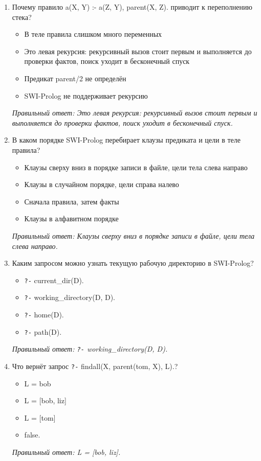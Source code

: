 \begin{enumerate}[label=\textbf{\arabic*.}, leftmargin=0pt, itemsep=1.2em]
\item Почему правило a(X, Y) :- a(Z, Y), parent(X, Z). приводит к переполнению стека?
\begin{itemize}[label=$\square$, leftmargin=1.5cm, itemsep=0.2em, topsep=0.3em]
\item В теле правила слишком много переменных
\item Это левая рекурсия: рекурсивный вызов стоит первым и выполняется до проверки фактов, поиск уходит в бесконечный спуск
\item Предикат parent/2 не определён
\item SWI-Prolog не поддерживает рекурсию
\end{itemize}
{\small\textit{Правильный ответ: Это левая рекурсия: рекурсивный вызов стоит первым и выполняется до проверки фактов, поиск уходит в бесконечный спуск.}}

\item В каком порядке SWI-Prolog перебирает клаузы предиката и цели в теле правила?
\begin{itemize}[label=$\square$, leftmargin=1.5cm, itemsep=0.2em, topsep=0.3em]
\item Клаузы сверху вниз в порядке записи в файле, цели тела слева направо
\item Клаузы в случайном порядке, цели справа налево
\item Сначала правила, затем факты
\item Клаузы в алфавитном порядке
\end{itemize}
{\small\textit{Правильный ответ: Клаузы сверху вниз в порядке записи в файле, цели тела слева направо.}}

\item Каким запросом можно узнать текущую рабочую директорию в SWI-Prolog?
\begin{itemize}[label=$\square$, leftmargin=1.5cm, itemsep=0.2em, topsep=0.3em]
\item \texttt{?-} current\_dir(D).
\item \texttt{?-} working\_directory(D, D).
\item \texttt{?-} home(D).
\item \texttt{?-} path(D).
\end{itemize}
{\small\textit{Правильный ответ: \texttt{?-} working\_directory(D, D).}}

\item Что вернёт запрос \texttt{?-} findall(X, parent(tom, X), L).?
\begin{itemize}[label=$\square$, leftmargin=1.5cm, itemsep=0.2em, topsep=0.3em]
\item L = bob
\item L = [bob, liz]
\item L = [tom]
\item false.
\end{itemize}
{\small\textit{Правильный ответ: L = [bob, liz].}}


\end{enumerate}
